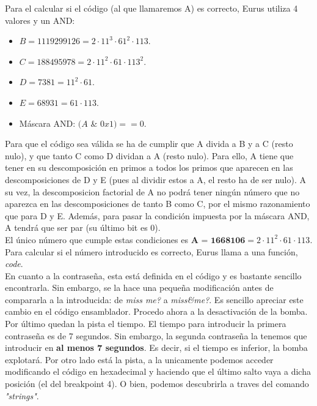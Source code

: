 \documentclass[11pt,a4paper]{article}
\begin{document}
Para el calcular si el código (al que llamaremos A) es correcto, Eurus utiliza 4 valores y un AND:
\begin{itemize}
	\item $B = 1119299126 = 2\cdot11^{3}\cdot61^{2}\cdot113$. 
	\item $C = 188495978 = 2\cdot11^{2}\cdot61\cdot113^{2}$.
	\item $D = 7381 = 11^{2}\cdot61$.
	\item $E = 68931 = 61\cdot113$.
	\item Máscara AND: $(A$ \& $0x1) == 0$.
\end{itemize}

Para que el código sea válida se ha de cumplir que A divida a B y a C (resto nulo), y que tanto C como D dividan a A (resto nulo). Para ello, A tiene que tener en su descomposición en primos a todos los primos que aparecen en las descomposiciones de D y E (pues al dividir estos a A, el resto ha de ser nulo). A su vez, la descomposicion factorial de A no podrá tener ningún número que no aparezca en las descomposiciones de tanto B como C, por el mismo razonamiento que para D y E. Además, para pasar la condición impuesta por la máscara AND, A tendrá que ser par (su último bit es 0). \\

El único número que cumple estas condiciones es $\textbf{A = 1668106} = 2\cdot11^{2}\cdot61\cdot113$. Para calcular si el número introducido es correcto, Eurus llama a una función, \emph{code}.\\

En cuanto a la contraseña, esta está definida en el código y es bastante sencillo encontrarla. Sin embargo, se la hace una pequeña modificación antes de compararla a la introducida: de \emph{miss me?} a \emph{miss\&me?}. Es sencillo apreciar este cambio en el código ensamblador. Procedo ahora a la desactivación de la bomba. \\

Por último quedan la pista el tiempo. El tiempo para introducir la primera contraseña es de 7 segundos. Sin embargo, la segunda contraseña la tenemos que introducir en \textbf{al menos 7 segundos}. Es decir, si el tiempo es inferior, la bomba explotará. Por otro lado está la pista, a la unicamente podemos acceder modificando el código en hexadecimal y haciendo que el último salto vaya a dicha posición (el del breakpoint 4). O bien, podemos descubrirla a traves del comando \emph{"strings"}. \\
\end{document}

